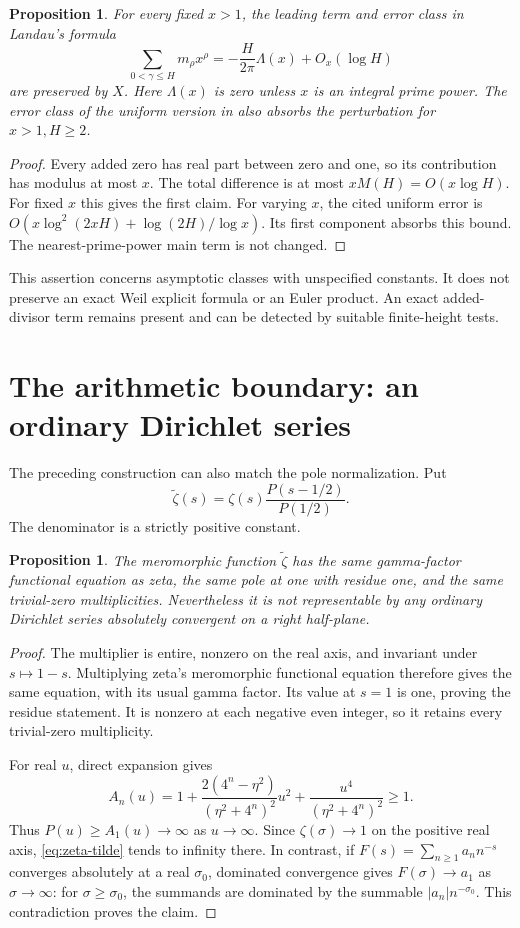 \documentclass[11pt,a4paper]{article}
\newtheorem{proposition}[theorem]{Proposition}
\theoremstyle{definition}
\theoremstyle{remark}
\begin{document}
\begin{proposition}\label{prop:landau}
For every fixed $x>1$, the leading term and error class in Landau's formula
\[
 \sum_{0<\gamma\le H}m_\rho x^\rho
       =-\frac{H}{2\pi}\Lambda(x)+O_x(\log H)
\]
are preserved by $X$. Here $\Lambda(x)$ is zero unless $x$ is an integral
prime power. The error class of the uniform version in \cite[Lemma 1]{FZ}
also absorbs the perturbation for $x>1,H\ge2$.
\end{proposition}
\begin{proof}
Every added zero has real part between zero and one, so its contribution
has modulus at most $x$. The total difference is at most
$xM(H)=O(x\log H)$. For fixed $x$ this gives the first claim.
For varying $x$, the cited uniform error is
$O(x\log^2(2xH)+\log(2H)/\log x)$. Its first component absorbs this
bound. The nearest-prime-power main term is not changed.
\end{proof}
This assertion concerns asymptotic classes with unspecified constants.
It does not preserve an exact Weil explicit formula or an Euler product.
An exact added-divisor term remains present and can be detected by suitable
finite-height tests.

\section{The arithmetic boundary: an ordinary Dirichlet series}

The preceding construction can also match the pole normalization. Put
\begin{equation}\label{eq:zeta-tilde}
 \widetilde\zeta(s)=\zeta(s)\frac{P(s-1/2)}{P(1/2)}.
\end{equation}
The denominator is a strictly positive constant.

\begin{proposition}\label{prop:dirichlet}
The meromorphic function $\widetilde\zeta$ has the same gamma-factor
functional equation as zeta, the same pole at one with residue one, and
the same trivial-zero multiplicities. Nevertheless it is not representable
by any ordinary Dirichlet series absolutely convergent on a right half-plane.
\end{proposition}
\begin{proof}
The multiplier is entire, nonzero on the real axis, and invariant under
$s\mapsto1-s$. Multiplying zeta's meromorphic functional equation therefore
gives the same equation, with its usual gamma factor. Its value at $s=1$
is one, proving the residue statement. It is nonzero at each negative even
integer, so it retains every trivial-zero multiplicity.

For real $u$, direct expansion gives
\[
 A_n(u)=1+
 \frac{2(4^n-\eta^2)}{(\eta^2+4^n)^2}u^2+
 \frac{u^4}{(\eta^2+4^n)^2}\ge1.
\]
Thus $P(u)\ge A_1(u)\to\infty$ as $u\to\infty$. Since
$\zeta(\sigma)\to1$ on the positive real axis, \eqref{eq:zeta-tilde}
tends to infinity there. In contrast, if
$F(s)=\sum_{n\ge1}a_n n^{-s}$ converges absolutely at a real $\sigma_0$,
dominated convergence gives $F(\sigma)\to a_1$ as $\sigma\to\infty$:
for $\sigma\ge\sigma_0$, the summands are dominated by the summable
$|a_n|n^{-\sigma_0}$. This contradiction proves the claim.
\end{proof}
\end{document}
